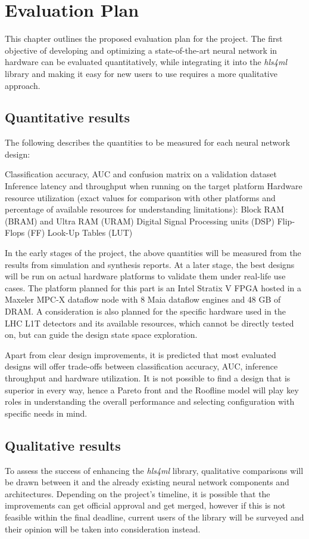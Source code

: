 \chapter{Evaluation Plan}\label{evaluation}
This chapter outlines the proposed evaluation plan for the project. The first objective of developing and optimizing a state-of-the-art neural network in hardware can be evaluated quantitatively, while integrating it into the \textit{hls4ml} library and making it easy for new users to use requires a more qualitative approach.

\section{Quantitative results}
The following describes the quantities to be measured for each neural network design:

\begin{outline}
  \1 Classification accuracy, AUC and confusion matrix on a validation dataset
  \1 Inference latency and throughput when running on the target platform
  \1 Hardware resource utilization (exact values for comparison with other platforms and percentage of available resources for understanding limitations):
    \2 Block RAM (BRAM) and Ultra RAM (URAM)
    \2 Digital Signal Processing units (DSP)
    \2 Flip-Flops (FF)
    \2 Look-Up Tables (LUT)
\end{outline}

In the early stages of the project, the above quantities will be measured from the results from simulation and synthesis reports. At a later stage, the best designs will be run on actual hardware platforms to validate them under real-life use cases. The platform planned for this part is an Intel Stratix V FPGA hosted in a Maxeler MPC-X dataflow node with 8 Maia dataflow engines and 48 GB of DRAM. A consideration is also planned for the specific hardware used in the LHC L1T detectors and its available resources, which cannot be directly tested on, but can guide the design state space exploration.

Apart from clear design improvements, it is predicted that most evaluated designs will offer trade-offs between classification accuracy, AUC, inference throughput and hardware utilization. It is not possible to find a design that is superior in every way, hence a Pareto front and the Roofline model will play key roles in understanding the overall performance and selecting configuration with specific needs in mind.


\section{Qualitative results}
To assess the success of enhancing the \textit{hls4ml} library, qualitative comparisons will be drawn between it and the already existing neural network components and architectures. Depending on the project's timeline, it is possible that the improvements can get official approval and get merged, however if this is not feasible within the final deadline, current users of the library will be surveyed and their opinion will be taken into consideration instead.
